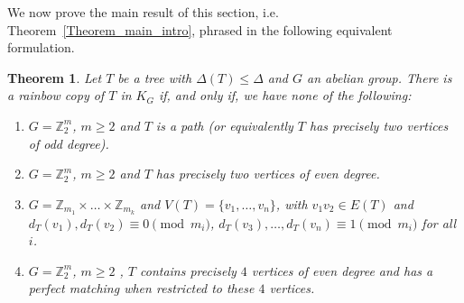 \documentclass[a4paper,11pt,hidelinks]{amsart}
\newtheorem{theorem}{Theorem}[section]
\theoremstyle{definition}
\begin{document}
We now prove the main result of this section, i.e. Theorem~\ref{Theorem_main_intro}, phrased in the following equivalent formulation.
\begin{theorem}\label{Theorem_harmonious_tree_characterization}
Let $T$ be a tree with $\Delta(T)\leq \Delta$  and $G$ an abelian group. There is a rainbow copy of $T$ in $K_G$ if, and only if, we have none of the following:
\begin{enumerate}[(1)]
\item $G=\mathbb{Z}_2^m$, $m\geq 2$  and  $T$ is a path (or equivalently $T$ has precisely two vertices of odd degree).
\item $G=\mathbb{Z}_2^m$, $m\geq 2$  and  $T$ has precisely two vertices of even degree.
\item $G=\mathbb{Z}_{m_1}\times\dots \times \mathbb{Z}_{m_k}$ and $V(T)=\{v_1, \dots, v_n\}$, with $v_1v_2\in E(T)$ and  $d_T(v_1), d_T(v_2)\equiv 0\pmod {m_i}$, $d_T(v_3), \dots, d_T(v_n)\equiv 1\pmod {m_i}$ for all $i$.
\item $G=\mathbb{Z}_2^m$, $m\geq 2$ , $T$ contains precisely $4$ vertices of  even degree and has a perfect matching when restricted to these $4$ vertices.
\end{enumerate}
\end{theorem}
\end{document}
